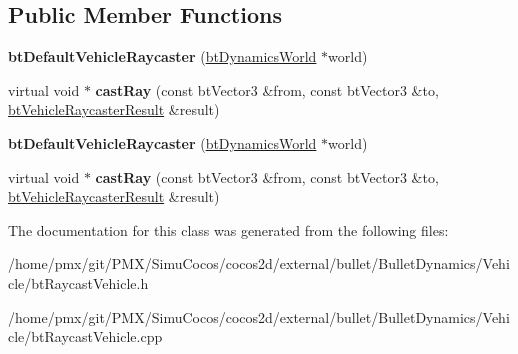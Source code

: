 \subsection*{Public Member Functions}
\begin{DoxyCompactItemize}
\item 
\mbox{\label{classbtDefaultVehicleRaycaster_ab8cc4f6d341d04452cdff35e4fb2198d}} 
{\bfseries bt\+Default\+Vehicle\+Raycaster} (\hyperlink{classbtDynamicsWorld}{bt\+Dynamics\+World} $\ast$world)
\item 
\mbox{\label{classbtDefaultVehicleRaycaster_a0d52996ccf166b42590e698dd30d43c1}} 
virtual void $\ast$ {\bfseries cast\+Ray} (const bt\+Vector3 \&from, const bt\+Vector3 \&to, \hyperlink{structbtVehicleRaycaster_1_1btVehicleRaycasterResult}{bt\+Vehicle\+Raycaster\+Result} \&result)
\item 
\mbox{\label{classbtDefaultVehicleRaycaster_ab8cc4f6d341d04452cdff35e4fb2198d}} 
{\bfseries bt\+Default\+Vehicle\+Raycaster} (\hyperlink{classbtDynamicsWorld}{bt\+Dynamics\+World} $\ast$world)
\item 
\mbox{\label{classbtDefaultVehicleRaycaster_aa80acc3a90209fb1e0dd50ed8017c8c4}} 
virtual void $\ast$ {\bfseries cast\+Ray} (const bt\+Vector3 \&from, const bt\+Vector3 \&to, \hyperlink{structbtVehicleRaycaster_1_1btVehicleRaycasterResult}{bt\+Vehicle\+Raycaster\+Result} \&result)
\end{DoxyCompactItemize}


The documentation for this class was generated from the following files\+:\begin{DoxyCompactItemize}
\item 
/home/pmx/git/\+P\+M\+X/\+Simu\+Cocos/cocos2d/external/bullet/\+Bullet\+Dynamics/\+Vehicle/bt\+Raycast\+Vehicle.\+h\item 
/home/pmx/git/\+P\+M\+X/\+Simu\+Cocos/cocos2d/external/bullet/\+Bullet\+Dynamics/\+Vehicle/bt\+Raycast\+Vehicle.\+cpp\end{DoxyCompactItemize}
